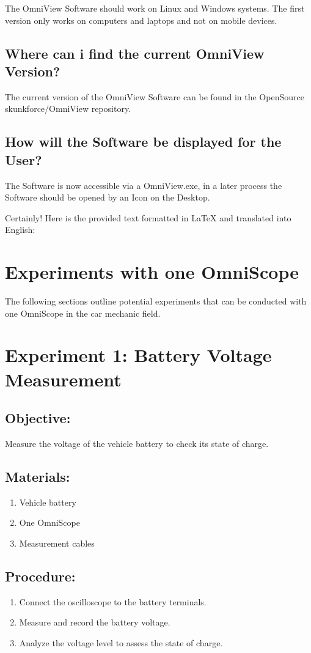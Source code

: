 \documentclass[]{scrreprt}
\begin{document}
\begin{itemize}
    The OmniView Software should work on Linux and Windows systems. The first version only works on computers and laptops and not on mobile devices.


    \subsection{Where can i find the current OmniView Version?}


    The current version of the OmniView Software can be found in the OpenSource skunkforce/OmniView repository.


    \subsection{How will the Software be displayed for the User?}


    The Software is now accessible via a OmniView.exe, in a later process the Software should be opened by an Icon on the Desktop.


    Certainly! Here is the provided text formatted in LaTeX and translated into English:


    \section{Experiments with one OmniScope}
    The following sections outline potential experiments that can be conducted with one OmniScope in the car mechanic field.


    \section*{Experiment 1: Battery Voltage Measurement}
    \subsection*{Objective:} Measure the voltage of the vehicle battery to check its state of charge.
    \subsection*{Materials:}
    \begin{enumerate}
        \item Vehicle battery
        \item One OmniScope
        \item Measurement cables
    \end{enumerate}
    \subsection*{Procedure:}
    \begin{enumerate}
        \item Connect the oscilloscope to the battery terminals.
        \item Measure and record the battery voltage.
        \item Analyze the voltage level to assess the state of charge.
    \end{enumerate}



\end{itemize}
\end{document}
